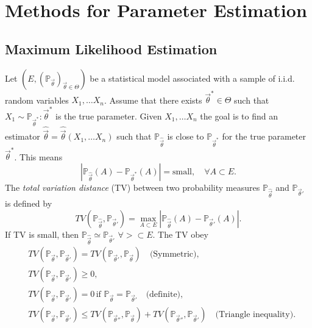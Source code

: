 \section{Methods for Parameter Estimation}

\subsection{Maximum Likelihood Estimation}
Let $(E,(\mathbb{P}_{\vec{\theta}})_{\vec{\theta}\in \Theta})$ be a statistical model associated with a sample of i.i.d. random variables $X_1,\dots X_n$. Assume that there exists $\vec{\theta}^*\in\Theta$ such that $X_1\sim \mathbb{P}_{\vec{\theta}^*}:\vec{\theta}^*$ is the true parameter. Given $X_1,\dots X_n$ the goal is to find an estimator $\hat{\vec{\theta}}=\hat{\vec{\theta}}(X_1,\dots X_n)$ such that $\mathbb{P}_{\hat{\vec{\theta}}}$ is close to $\mathbb{P}_{\vec{\theta}^*}$ for the true parameter $\vec{\theta}^*$. This means
\begin{equation}
	|\mathbb{P}_{\hat{\vec{\theta}}}(A)-\mathbb{P}_{\vec{\theta}^*}(A)|=\text{small},\quad \forall A\subset E.
\end{equation}
The \emph{total variation distance} (TV) between two probability measures $\mathbb{P}_{\hat{\vec{\theta}}}$ and $\mathbb{P}_{\vec{\theta}'}$ is defined by
\begin{equation}
	TV(\mathbb{P}_{\hat{\vec{\theta}}},\mathbb{P}_{\vec{\theta}'})=\max_{A\subset E}|\mathbb{P}_{\hat{\vec{\theta}}}(A)-\mathbb{P}_{\vec{\theta}'}(A)|.
\end{equation}
If TV is small, then $\mathbb{P}_{\hat{\vec{\theta}}}\simeq \mathbb{P}_{\vec{\theta} '}$ $\forall >\subset E$. The TV obey 
\begin{equation}
	\begin{split}
		&TV(\mathbb{P}_{\vec{\theta}},\mathbb{P}_{\vec{\theta}'})=TV(\mathbb{P}_{\vec{\theta}'},\mathbb{P}_{\vec{\theta}})\quad \text{(Symmetric)},\\
		&TV(\mathbb{P}_{\vec{\theta}},\mathbb{P}_{\vec{\theta}'})\geq 0,\\
		&TV(\mathbb{P}_{\vec{\theta}},\mathbb{P}_{\vec{\theta}'})=0\,\text{if } \mathbb{P}_{\vec{\theta}}=\mathbb{P}_{\vec{\theta}'}\quad \text{(definite)},\\
		&TV(\mathbb{P}_{\vec{\theta}},\mathbb{P}_{\vec{\theta}'})\leq TV(\mathbb{P}_{\vec{\theta}''},\mathbb{P}_{\vec{\theta}})+TV(\mathbb{P}_{\vec{\theta}''},\mathbb{P}_{\vec{\theta}'})\quad \text{(Triangle inequality)}.\\
	\end{split}
\end{equation}
